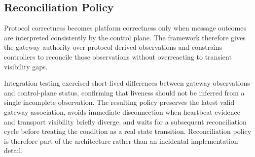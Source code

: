 \subsection{Reconciliation Policy}
Protocol correctness becomes platform correctness only when message outcomes are interpreted consistently by the control plane. The framework therefore gives the gateway authority over protocol-derived observations and constrains controllers to reconcile those observations without overreacting to transient visibility gaps.

Integration testing exercised short-lived differences between gateway observations and control-plane status, confirming that liveness should not be inferred from a single incomplete observation. The resulting policy preserves the latest valid gateway association, avoids immediate disconnection when heartbeat evidence and transport visibility briefly diverge, and waits for a subsequent reconciliation cycle before treating the condition as a real state transition. Reconciliation policy is therefore part of the architecture rather than an incidental implementation detail.

\FloatBarrier